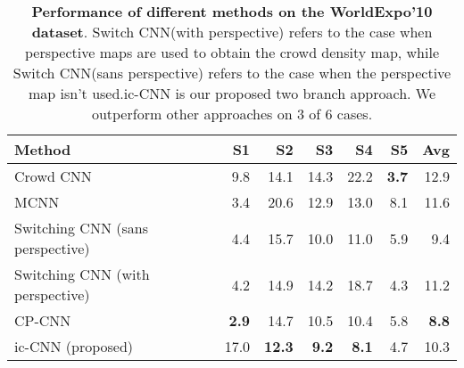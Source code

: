 \documentclass[runningheads]{llncs}
\begin{document}
\setlength{\tabcolsep}{7pt}
\begin{table}[!tbp]
\centering
\caption{{\bf Performance of different methods on the WorldExpo'10 dataset}.  Switch CNN(with perspective) refers to the case when perspective maps are used to obtain the crowd density map, while Switch CNN(sans perspective) refers to the case when the perspective map isn't used.ic-CNN is our proposed two branch approach. We outperform other approaches on 3 of 6 cases. \label{tab:worldexpo10}}
\begin{tabular}{lrrrrrr}
\toprule 
Method                         & S1 & S2 & S3 & S4 & S5 & Avg \\
\midrule
Crowd CNN~\cite{zhang2015cross}                   &  9.8  & 14.1   &  14.3  & 22.2   & \textbf{3.7}   &  12.9   \\
MCNN  ~\cite{zhang2016single}                         &  3.4  &  20.6  &  12.9  & 13.0   & 8.1   &   11.6  \\
Switching CNN (sans perspective)~\cite{sam2017switching}  &  4.4  &  15.7  & 10.0   & 11.0   & 5.9   & 9.4 \\
Switching CNN (with perspective)~\cite{sam2017switching} & 4.2   &   14.9 & 14.2   &  18.7  & 4.3   & 11.2 \\
CP-CNN\cite{sindagi2017generating} & \textbf{2.9 }& 14.7 &10.5
& 10.4 & 5.8 & \textbf{8.8 }\\
ic-CNN (proposed) & 17.0 & \textbf{12.3} &  \textbf{9.2}  & \textbf{8.1} & 4.7 & 10.3 \\
\bottomrule
\end{tabular}
\end{table}
 
\setlength{\tabcolsep}{25pt}
\end{document}
